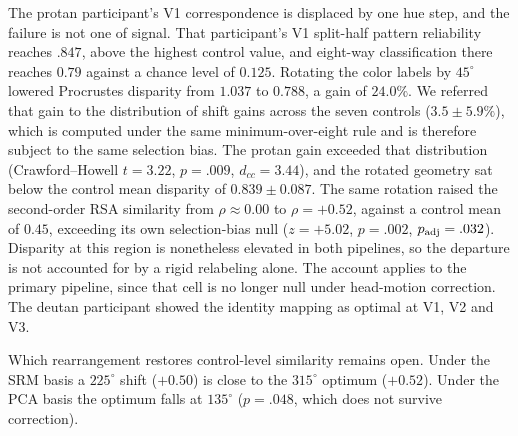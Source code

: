 The protan participant's V1 correspondence is displaced by one hue step, and the failure is not one of signal. That participant's V1 split-half pattern reliability reaches $.847$, above the highest control value, and eight-way classification there reaches $0.79$ against a chance level of $0.125$. Rotating the color labels by $45^\circ$ lowered Procrustes disparity from $1.037$ to $0.788$, a gain of $24.0\%$. We referred that gain to the distribution of shift gains across the seven controls ($3.5 \pm 5.9\%$), which is computed under the same minimum-over-eight rule and is therefore subject to the same selection bias. The protan gain exceeded that distribution (Crawford--Howell $t = 3.22$, $p = .009$, $d_{cc} = 3.44$), and the rotated geometry sat below the control mean disparity of $0.839 \pm 0.087$. The same rotation raised the second-order RSA similarity from $\rho \approx 0.00$ to $\rho = +0.52$, against a control mean of $0.45$, exceeding its own selection-bias null ($z = +5.02$, $p = .002$, $p_{\rm adj} = .032$). Disparity at this region is nonetheless elevated in both pipelines, so the departure is not accounted for by a rigid relabeling alone. The account applies to the primary pipeline, since that cell is no longer null under head-motion correction. The deutan participant showed the identity mapping as optimal at V1, V2 and V3.

Which rearrangement restores control-level similarity remains open. Under the SRM basis a $225^\circ$ shift ($+0.50$) is close to the $315^\circ$ optimum ($+0.52$). Under the PCA basis the optimum falls at $135^\circ$ ($p = .048$, which does not survive correction).